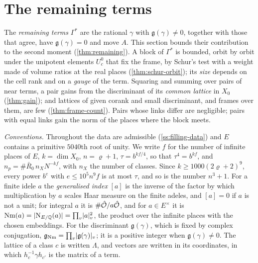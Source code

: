 \section{The remaining terms}\label{sec:remaining}

The \emph{remaining terms} $\Gamma^*$ are the rational $\gamma$ with $\mathfrak g(\gamma)\ne0$, together with those that agree, have $\mathfrak g(\gamma)=0$ and move $A$. This section bounds their contribution
to the second moment (\cref{thm:remaining}). A block of $\Gamma^*$ is bounded, orbit by orbit under the unipotent elements $U^0_c$ that fix the frame, by Schur's test with a weight made of
volume ratios at the real places (\cref{thm:schur-orbit}); its \emph{size} depends on the cell rank and on a \emph{gauge} of the term. Squaring and summing over pairs of near terms, a pair gains
from the discriminant of its \emph{common lattice} in $X_0$ (\cref{thm:gain}); and lattices of given corank and small discriminant, and frames over them, are few
(\cref{thm:frame-count}). Pairs whose links differ are negligible; pairs with equal links gain the norm of the places where the block meets.

\emph{Conventions.} Throughout the data are admissible (\cref{ss:filling-data}) and $E$ contains a primitive $5040$th root of unity. We write $f$ for the number of infinite places of $E$, $k=\dim X_0$,
$n=\varrho+1$, $\tau=b^{kf/4}$, so that $\tau^4=b^{kf}$, and $n_p=\#\bar R_0\,n_XN^{-kf}$, with $n_X$ the number of classes. Since $k\ge1000(2\varrho+2)^9$, every power $b^e$ with $e\le10^5n^9f$
is at most $\tau$, and so is the number $n^3+1$. For a finite idele $a$ the \emph{generalised index} $[a]$ is the inverse of the factor by which multiplication by $a$ scales Haar measure on the finite
adeles, and $[a]=0$ if $a$ is not a unit; for integral $a$ it is $\#\hat{\mathcal{O}}/a\hat{\mathcal{O}}$, and for $a\in E^\times$ it is $\mathrm{Nm}(a)=\lvert \mathrm N_{E/\mathbb{Q}}(a)\rvert=\prod_v\lvert a\rvert_v^2$, the product over the infinite places with the
chosen embeddings. For the discriminant $\mathfrak g(\gamma)$, which is fixed by complex conjugation, $\mathfrak g_{\rm Nm}=\prod_v\lvert \mathfrak g(\gamma)\rvert_v$; it is a positive integer when $\mathfrak g(\gamma)\ne0$.
The lattice of a class $c$ is written $\Lambda$, and vectors are written in its coordinates, in which $h_c^{-1}\gamma h_{c'}$ is the matrix of a term.

